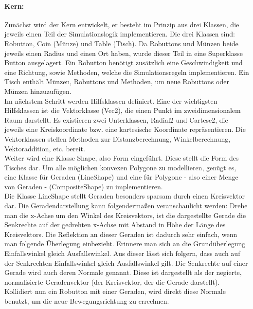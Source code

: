 \paragraph{Kern:}
Zunächst wird der Kern entwickelt, er besteht im Prinzip aus drei Klassen, die jeweils einen Teil der Simulationslogik implementieren.
Die drei Klassen sind: Robutton, Coin (Münze) und Table (Tisch). Da Robuttons und Münzen beide jeweils einen Radius und einen Ort haben,
wurde dieser Teil in eine Superklasse Button ausgelagert. Ein Robutton benötigt zusätzlich eine Geschwindigkeit und eine Richtung, sowie Methoden,
welche die Simulationsregeln implementieren.
Ein Tisch enthält Münzen, Robuttons und Methoden, um neue Robuttons oder Münzen hinzuzufügen. \\
Im nächstem Schritt werden Hilfsklassen definiert. Eine der wichtigsten Hilfsklassen ist die Vektorklasse (Vec2),
die einen Punkt im zweidimensionalem Raum darstellt. Es existieren zwei Unterklassen, Radial2 und Cartese2,
die jeweils eine Kreiskoordinate bzw. eine kartesische Koordinate repräsentieren.
Die Vektorklassen stellen Methoden zur Distanzberechnung, Winkelberechnung, Vektoraddition, etc. bereit. \\
Weiter wird eine Klasse Shape, also Form eingeführt. Diese stellt die Form des Tisches dar. Um alle möglichen konvexen Polygone zu modellieren,
genügt es, eine Klasse für Geraden (LineShape) und eine für Polygone - also einer Menge von Geraden - (CompositeShape) zu implementieren. \\
Die Klasse LineShape stellt Geraden besonders sparsam durch einen Kreisvektor dar. Die Geradendarstellung kann folgendermaßen veranschaulicht werden:
Drehe man die x-Achse um den Winkel des Kreisvektors, ist die dargestellte Gerade die Senkrechte auf der gedrehten x-Achse mit Abstand in Höhe
der Länge des Kreisvektors. Die Reflektion an dieser Geraden ist dadurch sehr einfach, wenn man folgende Überlegung einbezieht.
Erinnere man sich an die Grundüberlegung Einfallswinkel gleich Ausfallswinkel. Aus dieser lässt sich folgern, dass auch auf der Senkrechten
Einfallswinkel gleich Ausfallswinkel gilt. Die Senkrechte auf einer Gerade wird auch deren Normale genannt. Diese ist dargestellt als der
negierte, normalisierte Geradenvektor (der Kreisvektor, der die Gerade darstellt).
Kollidiert nun ein Robutton mit einer Geraden, wird direkt diese Normale benutzt, um die neue Bewegungsrichtung zu errechnen.
